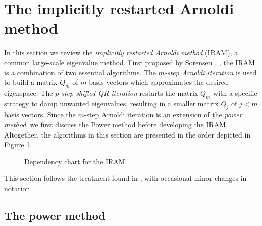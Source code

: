 \section{The implicitly restarted Arnoldi method}		\label{Subsec:evol_mats-IRAM}






In this section we review the \textit{implicitly restarted Arnoldi method} (IRAM), a common large-scale eigenvalue method.  
First proposed by Sorensen \cite{sorensen1992implicit}, \cite{sorensen1997implicitly}, the IRAM is a combination of two essential algorithms.  
The \textit{$m$-step Arnoldi iteration} is used to build a matrix $Q_m$ of $m$ basis vectors which approximates the desired eigenspace.  
The \textit{$p$-step shifted QR iteration} restarts the matrix $Q_m$ with a specific strategy to damp unwanted eigenvalues, resulting in a smaller matrix $Q_j$ of $j<m$ basis vectors.  
Since the $m$-step Arnoldi iteration is an extension of the \textit{power method}, we first discuss the Power method before developing the IRAM.  
Altogether, the algorithms in this section are presented in the order depicted in Figure \ref{Fig:IRAM_flowchart}.

\begin{figure}[H] 
\centering
{}
\caption{Dependency chart for the IRAM.}
\label{Fig:IRAM_flowchart}
\end{figure}

This section follows the treatment found in \cite[Chapters 8, 10]{golub2012matrix}, with occasional minor changes in notation.





\subsection{The power method} 			\label{Subsubsec:evol_mats-power_method}


